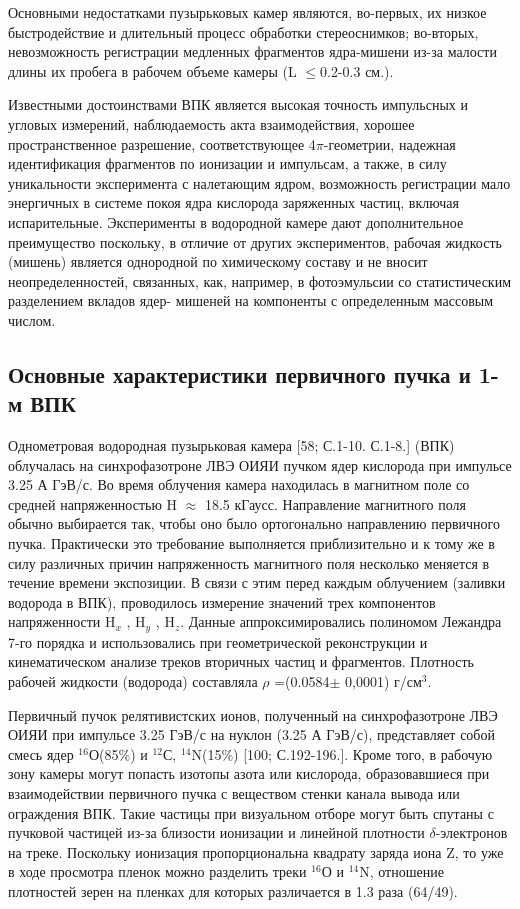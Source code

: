 \documentclass[fontsize=14pt]{scrarticle}
\begin{document}
Основными недостатками пузырьковых камер являются, во-первых, их
низкое быстродействие и длительный процесс обработки стереоснимков; во-вторых, невозможность регистрации медленных фрагментов ядра-мишени
из-за малости длины их пробега в рабочем объеме камеры (L $\le$0.2-0.3 см.).

Известными достоинствами ВПК является высокая точность импульсных и угловых измерений, наблюдаемость акта взаимодействия, хорошее пространственное разрешение, соответствующее 4$\pi$-геометрии, надежная идентификация фрагментов по ионизации и импульсам, а также, в силу уникальности эксперимента с налетающим ядром, возможность
регистрации мало энергичных в системе покоя ядра кислорода заряженных
частиц, включая испарительные. Эксперименты в водородной камере дают
дополнительное преимущество поскольку, в отличие от других
экспериментов, рабочая жидкость (мишень) является однородной по
химическому составу и не вносит неопределенностей, связанных, как,
например, в фотоэмульсии со статистическим разделением вкладов ядер-
мишеней на компоненты с определенным массовым числом.

\subsection{Основные характеристики первичного пучка и 1-м ВПК}
\hspace{0.6cm}
Однометровая водородная пузырьковая камера [58; С.1-10. С.1-8.]
(ВПК) облучалась на синхрофазотроне ЛВЭ ОИЯИ пучком ядер кислорода
при импульсе 3.25 А ГэВ/с. Во время облучения камера находилась в
магнитном поле со средней напряженностью H $\approx$ 18.5 кГаусс. Направление магнитного поля обычно выбирается так, чтобы оно было ортогонально направлению первичного пучка. Практически это требование выполняется приблизительно и к тому же в силу различных причин напряженность магнитного поля несколько меняется в течение времени экспозиции. В связи с этим перед каждым облучением (заливки водорода в ВПК), проводилось измерение значений трех компонентов напряженности H$_{x}$ , H$_{y}$ , H$_{z}$. Данные аппроксимировались полиномом Лежандра 7-го порядка и использовались при геометрической реконструкции и кинематическом анализе треков вторичных частиц и фрагментов. Плотность рабочей жидкости (водорода) составляла $\rho$ =(0.0584$\pm$ 0,0001) г/см$^{3}$.

Первичный пучок релятивистских ионов, полученный на синхрофазотроне ЛВЭ ОИЯИ при импульсе 3.25 ГэВ/с на нуклон (3.25 А ГэВ/с), представляет собой смесь ядер $^{16}$О(85\%) и $^{12}$С, $^{14}$N(15\%) [100; С.192-196.]. Кроме того, в рабочую зону камеры могут попасть изотопы азота или кислорода, образовавшиеся при взаимодействии первичного пучка с веществом стенки канала вывода или ограждения ВПК. Такие частицы при визуальном отборе могут быть спутаны с пучковой частицей из-за близости
ионизации и линейной плотности $\delta$-электронов на треке. Поскольку ионизация пропорциональна квадрату заряда иона Z, то уже в ходе просмотра пленок можно разделить треки $^{16}$О и $^{14}$N, отношение плотностей зерен на пленках для которых различается в 1.3 раза (64/49). 
\end{document}
